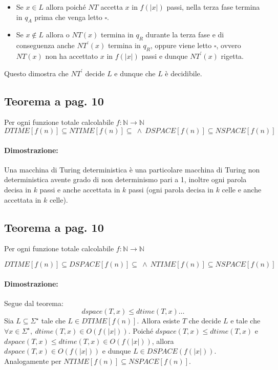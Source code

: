 \begin{itemize}
    \item {
        Se $x\in L$ allora poiché $NT$ accetta $x$ in $f(|x|)$ passi, nella terza fase termina in $q_{A}$ prima che venga
        letto $\square$.
    }
    \item {
        Se $x\notin L$ allora o $NT(x)$ termina in $q_{R}$ durante la terza fase e di conseguenza anche $NT^{'}(x)$ termina in $q_{R}$,
        oppure viene letto $\square$, ovvero $NT(x)$ non ha accettato $x$ in $f(|x|)$ passi e dunque $NT^{'}(x)$ rigetta.
    }
\end{itemize}
Questo dimostra che $NT^{'}$ decide $L$ e dunque che $L$ è decidibile.
\subsection{Teorema a pag. 10}

Per ogni funzione totale calcolabile $f: \mathbb{N} \rightarrow \mathbb{N}$ 
$$DTIME[f(n)] \subseteq NTIME[f(n)] \subseteq\ \land\ DSPACE[f(n)] \subseteq NSPACE[f(n)]$$ 

\paragraph*{Dimostrazione:} Una macchina di Turing deterministica è una particolare macchina di Turing non deterministica 
avente grado di non determinismo pari a 1, inoltre ogni parola decisa in $k$ passi e anche accettata in $k$ passi 
(ogni parola decisa in $k$ celle e anche accettata in $k$ celle).

\newpage
\subsection{Teorema a pag. 10}

Per ogni funzione totale calcolabile $f: \mathbb{N} \rightarrow \mathbb{N}$ 

$$DTIME[f(n)] \subseteq DSPACE[f(n)] \subseteq\ \land\ NTIME[f(n)] \subseteq NSPACE[f(n)]$$ 

\paragraph*{Dimostrazione:} Segue dal teorema:
$$dspace(T, x) \leq dtime(T, x)\dots$$
Sia $L \subseteq \Sigma^{\star}$ tale che $L \in DTIME[f(n)]$. Allora esiste $T$ che decide $L$ e tale che 
$\forall x\in \Sigma^{\star},\ dtime(T, x) \in O(f(|x|))$. Poiché $dspace(T, x) \leq dtime(T, x)$ e $dspace(T, x) \leq dtime(T, x) \in O(f(|x|))$,
allora $dspace(T, x) \in O(f(|x|))$ e dunque $L \in DSPACE(f(|x|))$. Analogamente per $NTIME[f(n)] \subseteq NSPACE[f(n)]$.

